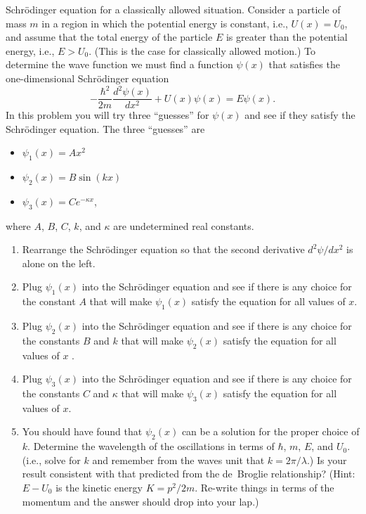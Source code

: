 \begin{aproblem}{Schr\"odinger equation for a classically allowed
situation.}  
  Consider a particle of mass $m$ in a region in which the potential
  energy is constant, i.e., $U(x)=U_0$, and assume that the total
  energy of the particle $E$ is greater than the potential energy,
  i.e., $E>U_0$.  (This is the case for classically allowed motion.)
  To determine the wave function we must find a function $\psi(x)$
  that satisfies the one-dimensional Schr\"{o}dinger equation
  \[ -\frac{\hbar^2}{2m} \frac{d^2\psi(x)}{dx^2} + U(x)\psi(x) 
  = E\psi(x).  
  \]
  In this problem you will try three ``guesses'' for $\psi(x)$ and see
  if they satisfy the Schr\"{o}dinger equation. The three ``guesses''
  are
  \begin{itemize}
  \item $\psi_1(x) = Ax^2$ 
  \item $\psi_2(x) = B\sin(kx)$
  \item $\psi_3(x) = Ce^{-\kappa x}$,
  \end{itemize}
  where $A$, $B$, $C$, $k$, and $\kappa$ are undetermined real
  constants.
  \begin{enumerate}
  \item Rearrange the Schr\"{o}dinger equation so that the second
    derivative $d^2\psi/dx^2$ is alone on the left.
  \item Plug $\psi_1(x)$ into the Schr\"{o}dinger equation and see if
    there is any choice for the constant $A$ that will make
    $\psi_1(x)$ satisfy the equation for all values of $x$.
  \item Plug $\psi_2(x)$ into the Schr\"{o}dinger equation and see if
    there is any choice for the constants $B$ and $k$ that will make
    $\psi_2(x)$ satisfy the equation for all values of $x$ .
  \item Plug $\psi_3(x)$ into the Schr\"{o}dinger equation and see if
    there is any choice for the constants $C$ and $\kappa$ that will
    make $\psi_3(x)$ satisfy the equation for all values of $x$.
  \item You should have found that $\psi_2(x)$ can be a solution for
    the proper choice of $k$.  Determine the wavelength of the
    oscillations in terms of $\hbar$, $m$, $E$, and $U_0$. (i.e.,
    solve for $k$ and remember from the waves unit that
    $k=2\pi/\lambda$.)  Is your result consistent with that predicted
    from the de~Broglie relationship?  (Hint: $E-U_0$ is the kinetic
    energy $K = p^2/2m$.  Re-write things in terms of the momentum and
    the answer should drop into your lap.)
  \end{enumerate}
\end{aproblem}


